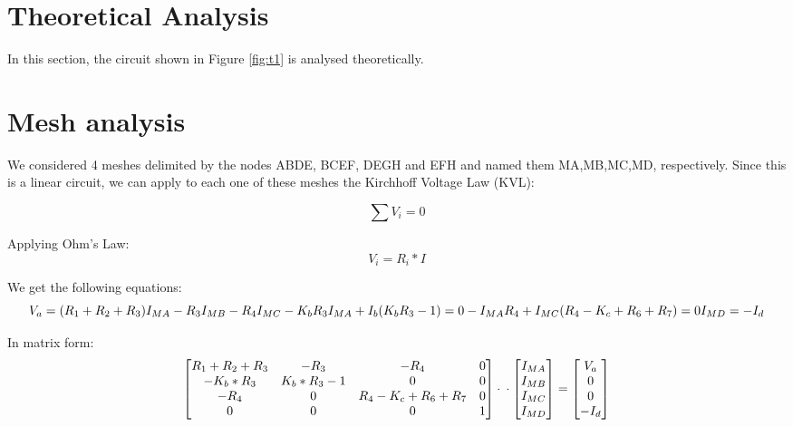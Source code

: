 \section{Theoretical Analysis}
\label{sec:analysis}

In this section, the circuit shown in Figure \ref{fig:t1} is analysed
theoretically.

\section{Mesh analysis}
We considered 4 meshes delimited by the nodes ABDE, BCEF, DEGH and EFH and named them MA,MB,MC,MD, respectively. Since this is a linear circuit, we can apply to each one of these meshes the Kirchhoff Voltage Law (KVL):


\begin{equation}
  \sum V_i = 0
  \label{eq:KVL}
\end{equation}

Applying Ohm's Law:
\begin{equation}
  V_i= R_i * I
  \label{eq:OhmLaw}
\end{equation}

We get the following equations:
\begin{equation}
    
     V_a = (R_1+R_2+R_3)I_{MA} - R_3I_{MB} - R_4I_{MC}\\
  
    -K_bR_3I_{MA} + I_b(K_bR_3-1)=0\\
  
    -I_{MA}R_4 + I_{MC}(R_4-K_c+R_6+R_7)=0\\
   
    I_{MD}= -I_d

  \label{eq:malhas}
\end{equation}

In matrix form:
  \begin{equation}\label{eq:matrixeqn}
\begin{bmatrix}
R_1+R_2+R_3 & -R_3 & -R_4 & 0 \\

-K_b*R_3 & K_b* R_3-1 & 0 & 0 \\

-R_4 & 0 & R_4-K_c+R_6+R_7 & 0 \\

0 & 0 & 0 & 1 \\
\end{bmatrix}
\cdot

\\

\cdot
\begin{bmatrix}
I_{MA} \\
I_{MB} \\
I_{MC} \\
I_{MD} \\
    \end{bmatrix}
=
    \begin{bmatrix}
V_a \\
0 \\
0 \\
-I_d\\
    \end{bmatrix}
  \end{equation}

